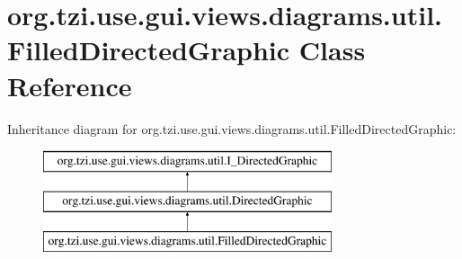 \hypertarget{classorg_1_1tzi_1_1use_1_1gui_1_1views_1_1diagrams_1_1util_1_1_filled_directed_graphic}{\section{org.\-tzi.\-use.\-gui.\-views.\-diagrams.\-util.\-Filled\-Directed\-Graphic Class Reference}
\label{classorg_1_1tzi_1_1use_1_1gui_1_1views_1_1diagrams_1_1util_1_1_filled_directed_graphic}
}
Inheritance diagram for org.\-tzi.\-use.\-gui.\-views.\-diagrams.\-util.\-Filled\-Directed\-Graphic\-:\begin{figure}[H]
\begin{center}
\leavevmode
\includegraphics[height=3.000000cm]{classorg_1_1tzi_1_1use_1_1gui_1_1views_1_1diagrams_1_1util_1_1_filled_directed_graphic}
\end{center}
\end{figure}
